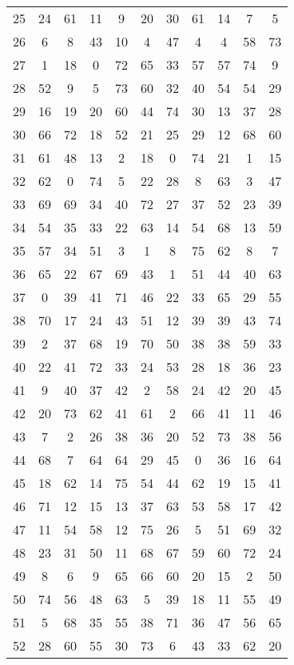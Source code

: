 \begin{table}
\begin{tabular}{c c c c c c c c c c c }
25 & 24 & 61 & 11 & 9 & 20 & 30 & 61 & 14 & 7 & 5 \\
26 & 6 & 8 & 43 & 10 & 4 & 47 & 4 & 4 & 58 & 73 \\
27 & 1 & 18 & 0 & 72 & 65 & 33 & 57 & 57 & 74 & 9 \\
28 & 52 & 9 & 5 & 73 & 60 & 32 & 40 & 54 & 54 & 29 \\
29 & 16 & 19 & 20 & 60 & 44 & 74 & 30 & 13 & 37 & 28 \\
30 & 66 & 72 & 18 & 52 & 21 & 25 & 29 & 12 & 68 & 60 \\
31 & 61 & 48 & 13 & 2 & 18 & 0 & 74 & 21 & 1 & 15 \\
32 & 62 & 0 & 74 & 5 & 22 & 28 & 8 & 63 & 3 & 47 \\
33 & 69 & 69 & 34 & 40 & 72 & 27 & 37 & 52 & 23 & 39 \\
34 & 54 & 35 & 33 & 22 & 63 & 14 & 54 & 68 & 13 & 59 \\
35 & 57 & 34 & 51 & 3 & 1 & 8 & 75 & 62 & 8 & 7 \\
36 & 65 & 22 & 67 & 69 & 43 & 1 & 51 & 44 & 40 & 63 \\
37 & 0 & 39 & 41 & 71 & 46 & 22 & 33 & 65 & 29 & 55 \\
38 & 70 & 17 & 24 & 43 & 51 & 12 & 39 & 39 & 43 & 74 \\
39 & 2 & 37 & 68 & 19 & 70 & 50 & 38 & 38 & 59 & 33 \\
40 & 22 & 41 & 72 & 33 & 24 & 53 & 28 & 18 & 36 & 23 \\
41 & 9 & 40 & 37 & 42 & 2 & 58 & 24 & 42 & 20 & 45 \\
42 & 20 & 73 & 62 & 41 & 61 & 2 & 66 & 41 & 11 & 46 \\
43 & 7 & 2 & 26 & 38 & 36 & 20 & 52 & 73 & 38 & 56 \\
44 & 68 & 7 & 64 & 64 & 29 & 45 & 0 & 36 & 16 & 64 \\
45 & 18 & 62 & 14 & 75 & 54 & 44 & 62 & 19 & 15 & 41 \\
46 & 71 & 12 & 15 & 13 & 37 & 63 & 53 & 58 & 17 & 42 \\
47 & 11 & 54 & 58 & 12 & 75 & 26 & 5 & 51 & 69 & 32 \\
48 & 23 & 31 & 50 & 11 & 68 & 67 & 59 & 60 & 72 & 24 \\
49 & 8 & 6 & 9 & 65 & 66 & 60 & 20 & 15 & 2 & 50 \\
50 & 74 & 56 & 48 & 63 & 5 & 39 & 18 & 11 & 55 & 49 \\
51 & 5 & 68 & 35 & 55 & 38 & 71 & 36 & 47 & 56 & 65 \\
52 & 28 & 60 & 55 & 30 & 73 & 6 & 43 & 33 & 62 & 20 \\

\end{tabular}
\end{table}
